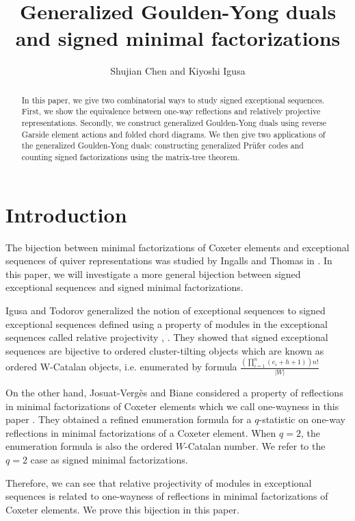 \documentclass[11pt]{amsart}
\title{Generalized Goulden-Yong duals and signed minimal factorizations}
\author{Shujian Chen and Kiyoshi Igusa}
\date{}
\begin{document}
\maketitle

\begin{abstract}
    In this paper, we give two combinatorial ways to study signed exceptional sequences. First, we show the equivalence between one-way reflections and relatively projective representations. Secondly, we construct generalized Goulden-Yong duals using reverse Garside element actions and folded chord diagrams. We then give two applications of the generalized Goulden-Yong duals: constructing generalized Pr\"{u}fer codes and counting signed factorizations using the matrix-tree theorem.
\end{abstract}

\tableofcontents

\section*{Introduction}
The bijection between minimal factorizations of Coxeter elements and exceptional sequences of quiver representations was studied by Ingalls and Thomas in \cite{ingalls2009noncrossing}. In this paper, we will investigate a more general bijection between signed exceptional sequences and signed minimal factorizations.

Igusa and Todorov generalized the notion of exceptional sequences to signed exceptional sequences defined using a property of modules in the exceptional sequences called relative projectivity \cite{igusa2017signed}, \cite{igusa26history}. They showed that signed exceptional sequences are bijective to ordered cluster-tilting objects which are known as ordered W-Catalan objects, i.e. enumerated by formula $\frac{(\prod_{i=1}^n(e_i+h+1))n!}{|W|}$

On the other hand, Josuat-Verg\`es and Biane considered a property of reflections in minimal factorizations of Coxeter elements which we call one-wayness in this paper \cite{biane2019noncrossing}\cite{MR3395490}. They obtained a refined enumeration formula for a $q$-statistic on one-way reflections in minimal factorizations of a Coxeter element. When $q=2$, the enumeration formula is also the ordered $W$-Catalan number. We refer to the $q=2$ case as signed minimal factorizations.

Therefore, we can see that relative projectivity of modules in exceptional sequences is related to one-wayness of reflections in minimal factorizations of Coxeter elements. We prove this bijection in this paper.
\end{document}
